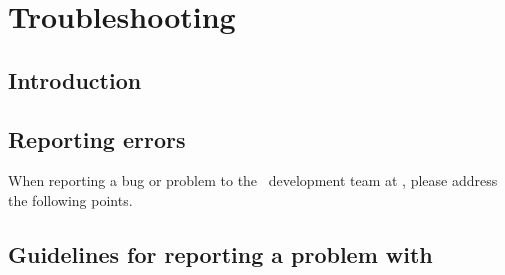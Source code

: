 \section{Troubleshooting\label{sec:trouble-shooting}}

\subsection{Introduction}

\subsection{Reporting errors\label{sec:reporting-errors}}

When reporting a bug or problem to the \CNAME\ development team at \email, please address the following points.

\subsection{Guidelines for reporting a problem with \CNAME\label{sec:error-guidelines}}

